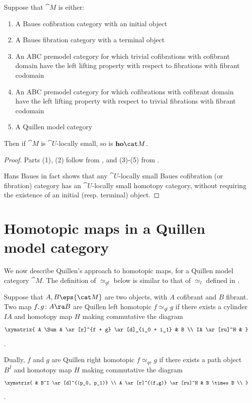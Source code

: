 \begin{cor}
\label{cor:smallhomotopycat}
Suppose that ${\cat M}$ is either:
\begin{enumerate}
\item
A Baues cofibration category with an initial object
\item
A Baues fibration category with a terminal object
\item
An ABC premodel category for which trivial cofibrations with cofibrant domain have the left lifting property with respect to fibrations with fibrant codomain
\item
An ABC premodel category for which cofibrations with cofibrant domain have the left lifting property with respect to trivial fibrations with fibrant codomain
\item
A Quillen model category
\end{enumerate}

Then if ${\cat M}$ is ${\cat U}$-locally small, so is ${\bf ho}{\cat M}$.
\end{cor}

\begin{proof}
Parts (1), (2) follow from , and (3)-(5) from . 

Hans Baues in fact shows \cite{Baues1} that any ${\cat U}$-locally small Baues cofibration  (or fibration) category has an ${\cat U}$-locally small homotopy category, without requiring the existence of an initial (resp. terminal) object.
\end{proof}

\section{Homotopic maps in a Quillen model category}
We now describe Quillen's approach to homotopic maps, for a Quillen model category ${\cat M}$. The definition of $\simeq_{ql}$ below is similar to that of $\simeq_l$ defined in .

Suppose that $A, B \eps {\cat M}$ are two objects, with $A$ cofibrant and $B$ fibrant. Two map $f, g \colon A \ra B$ are Quillen left homotopic $f \simeq_{ql} g$ if there exists a cylinder $IA$ and homotopy map $H$ making commutative the diagram
\[
\xymatrix{
  A \Sum A \ar[r]^{f + g} \ar[d]_{i_0 + i_1} & B  \\
  IA \ar[ru]^H & 
}
\].

Dually, $f$ and $g$ are Quillen right homotopic $f \simeq_{qr} g$ if there exists a path object $B^I$ and homotopy map $H$ making commutative the diagram
\[
\xymatrix{
  & B^I \ar[d]^{(p_0, p_1)} \\
  A \ar[r]^{(f,g)} \ar[ru]^H & B \times B   \\
}
\].

